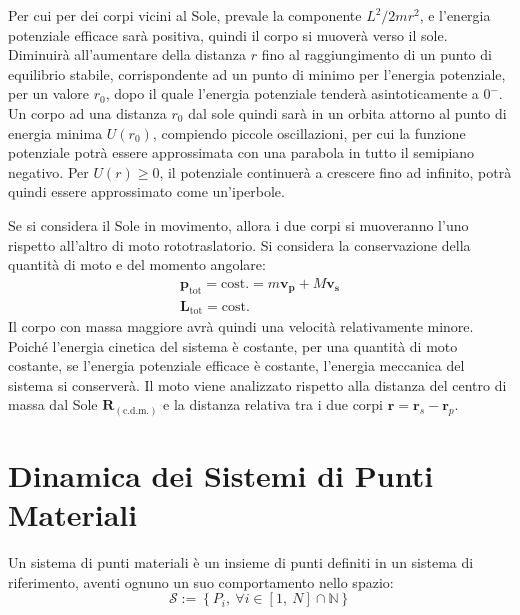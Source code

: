 \documentclass{article}
\newcommand{\vect}[1]{\boldsymbol{\mathbf{#1}}}
\numberwithin{equation}{subsection}
\begin{document}
Per cui per dei corpi vicini al Sole, prevale la componente ${L^2}/{2mr^2}$, e l'energia potenziale efficace sarà positiva, quindi 
il corpo si muoverà verso il sole. Diminuirà all'aumentare della distanza $r$ fino al raggiungimento di un punto di equilibrio stabile, corrispondente ad un punto 
di minimo per l'energia potenziale, per un valore 
$r_0$, dopo il quale l'energia potenziale tenderà asintoticamente a $0^-$. Un corpo ad una distanza $r_0$ dal sole quindi sarà in un orbita attorno al 
punto di energia minima $U(r_0)$, compiendo piccole oscillazioni, per cui la funzione potenziale potrà essere approssimata con una parabola in 
tutto il semipiano negativo. Per $U(r)\geq0$, il potenziale continuerà a crescere fino ad infinito, potrà quindi essere approssimato come un'iperbole. 




Se si considera il Sole in movimento, allora i due corpi si muoveranno l'uno rispetto all'altro di moto rototraslatorio. Si considera la conservazione della quantità di moto 
e del momento angolare: 
\begin{gather*}
    \vect{p}_\mathrm{tot}=\mathrm{cost.}=m\vect{v_p}+M\vect{v_s}\\
    \vect{L}_\mathrm{tot}=\mathrm{cost.}
\end{gather*}
Il corpo con massa maggiore avrà quindi una velocità relativamente minore. Poiché l'energia cinetica del sistema è costante, per una quantità di moto costante, 
se l'energia potenziale efficace è costante, l'energia meccanica del sistema si conserverà. Il moto viene analizzato rispetto alla distanza 
del centro di massa dal Sole $\vect{R}_{(\mathrm{c.d.m.})}$ e la distanza relativa tra i due corpi $\vect{r}=\vect{r}_s-\vect{r}_p$. 

\clearpage

\section{Dinamica dei Sistemi di Punti Materiali}

Un sistema di punti materiali è un insieme di punti definiti 
in un sistema di riferimento, aventi ognuno un suo 
comportamento nello spazio:
\begin{equation}
    \mathscr{S}:=\left\{P_i,\:\forall i\in[1,\:N]\cap\mathbb{N}\right\}
\end{equation}
\end{document}
